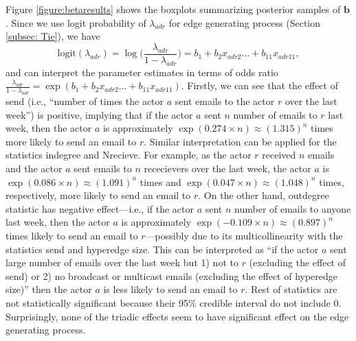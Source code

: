 \documentclass[ba]{imsart}
\numberwithin{equation}{section}
\theoremstyle{plain}
\begin{document}
	Figure \ref{figure:betaresults} shows the boxplots summarizing posterior samples of $\boldsymbol{b}$. Since we use logit probability of $\lambda_{adr}$ for edge generating process (Section \ref{subsec: Tie}), we have
	\begin{equation*}
	\mbox{logit}(\lambda_{adr})=\log\Big(\frac{\lambda_{adr}}{1-\lambda_{adr}}\Big) =b_{1}+b_{2} x_{adr2}\ldots+b_{11}x_{adr11},
	\end{equation*}
	and can interpret the parameter estimates in terms of odds ratio $\frac{\lambda_{adr}}{1-\lambda_{adr}}=\exp(b_{1}+b_{2} x_{adr2}\ldots+b_{11}x_{adr11})$.
	Firstly, we can see that the effect of send (i.e., ``number of times the actor $a$ sent emails to the actor $r$ over the last week'') is positive, implying that if the actor $a$ sent $n$ number of emails to $r$ last week, then the actor $a$ is approximately $\exp(0.274\times n)\approx(1.315)^n$ times more likely to send an email to $r$. Similar interpretation can be applied for the statistics indegree and Nrecieve. For example, as the actor $r$ received $n$ emails and the actor $a$ sent emails to $n$ rececievers over the last week, the actor $a$ is $\exp(0.086\times n)\approx(1.091)^n $ times and $\exp(0.047\times n)\approx(1.048)^n$ times, respectively, more likely to send an email to $r$. On the other hand, outdegree statistic has negative effect---i.e., if the actor $a$ sent $n$ number of emails to anyone last week, then the actor $a$ is approximately $\exp(-0.109\times n)\approx(0.897)^n$ times likely to send an email to $r$---possibly due to its multicollinearity with the statistics send and hyperedge size. This can be interpreted as ``if the actor $a$ sent large number of emails over the last week but 1) not to $r$ (excluding the effect of send) or 2) no broadcast or multicast emails (excluding the effect of hyperedge size)'' then the actor $a$ is less likely to send an email to $r$. Rest of statistics are not statistically significant because their 95\% credible interval do not include 0. Surprisingly, none of the triadic effects seem to have significant effect on the edge generating process.
	
\end{document}
